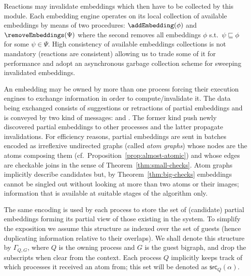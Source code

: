 \documentclass[a4paper,english,10pt]{article}
\theoremstyle{plain}\newtheorem{theorem}{Theorem}
\theoremstyle{plain}\newtheorem{corollary}[theorem]{Corollary}
\theoremstyle{plain}\newtheorem{proposition}[theorem]{Proposition}
\theoremstyle{plain}\newtheorem{lemma}[theorem]{Lemma}
\theoremstyle{plain}\newtheorem{definition}{Definition}
\theoremstyle{plain}\newtheorem{remark}{Remark}
\theoremstyle{plain}\newtheorem{example}[remark]{Example}
\newcommand{\?}[1]{}
\newcommand{\src}{\mathsf{src}}
\begin{document}
Reactions may invalidate embeddings which then have to be collected
by this module. 
Each embedding engine operates on its local collection of available embeddings 
by means of two procedures:	
$\addEmbedding(\phi)$ and $\removeEmbeddings(\Psi)$ where the
second removes all embeddings $\phi$ s.t.~$\psi \sqsubseteq \phi$ 
for some $\psi \in \Psi$. 
High consistency of available embeddings collections is not 
mandatory (reactions are consistent) allowing us
to trade some of it for performance and adopt an asynchronous
garbage collection scheme for sweeping invalidated embeddings.

An embedding may be owned by more than one process forcing their
execution engines to exchange information in order to 
compute/invalidate it. 
The data being exchanged consists of suggestions or retractions of
partial embeddings and is conveyed by two kind of messages: \sug and \ret. 
The former kind push newly discovered partial embeddings to other 
processes and the latter propagate invalidations.
For efficiency reasons, partial embeddings are sent in batches 
encoded as irreflexive undirected graphs (called \emph{atom graphs}) 
whose nodes are the atoms composing them 
(cf.~Proposition~\ref{prop:almost-atomic}) and whose edges
are checkable joins in the sense of Theorem~\ref{thm:small-checks}.
Atom graphs implicitly describe candidates but, by Theorem~\ref{thm:big-checks}
embeddings cannot be singled out without looking at more than
two atoms or their images; information that is available at suitable
stages of the algorithm only.

The same encoding is used by each process to store the set of
(candidate) partial embeddings forming its partial view of those
existing in the system. To simplify the exposition we assume this 
structure as indexed over the set of guests (hence duplicating information
relative to their overlaps).
We shall denote this structure by $\Gamma_{Q,G}$,
where $Q$ is the owning process and $G$ is the guest bigraph,
and drop the subscripts when clear from the context.
Each process $Q$ implicitly keeps track of which processes
it received an atom from; this set will be denoted as 
$\src_Q(\alpha)$.
\end{document}
